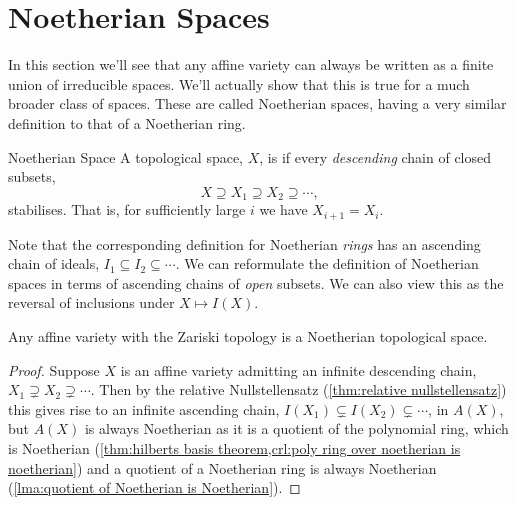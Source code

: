 \documentclass[fleqn]{NotesClass}
\begin{document}
    \section{Noetherian Spaces}
    In this section we'll see that any affine variety can always be written as a finite union of irreducible spaces.
    We'll actually show that this is true for a much broader class of spaces.
    These are called Noetherian spaces, having a very similar definition to that of a Noetherian ring.
    
    \begin{dfn}{Noetherian Space}{}
        A topological space, \(X\), is  if every \emph{descending} chain of closed subsets,
        \begin{equation}
            X \supseteq X_1 \supseteq X_2 \supseteq \dotsb,
        \end{equation}
        stabilises.
        That is, for sufficiently large \(i\) we have \(X_{i+1} = X_i\).
    \end{dfn}
    
    Note that the corresponding definition for Noetherian \emph{rings} has an ascending chain of ideals, \(I_1 \subseteq I_2 \subseteq \dotsb\).
    We can reformulate the definition of Noetherian spaces in terms of ascending chains of \emph{open} subsets.
    We can also view this as the reversal of inclusions under \(X \mapsto I(X)\).
    
    \begin{lma}{}{}
        Any affine variety with the Zariski topology is a Noetherian topological space.
        \begin{proof}
            Suppose \(X\) is an affine variety admitting an infinite descending chain, \(X_1 \supsetneq X_2 \supsetneq \dotsb\).
            Then by the relative Nullstellensatz (\cref{thm:relative nullstellensatz}) this gives rise to an infinite ascending chain, \(I(X_1) \subsetneq I(X_2) \subsetneq \dotsb\), in \(A(X)\), but \(A(X)\) is always Noetherian as it is a quotient of the polynomial ring, which is Noetherian (\cref{thm:hilberts basis theorem,crl:poly ring over noetherian is noetherian}) and a quotient of a Noetherian ring is always Noetherian (\cref{lma:quotient of Noetherian is Noetherian}).
        \end{proof}
    \end{lma}
    
\end{document}
